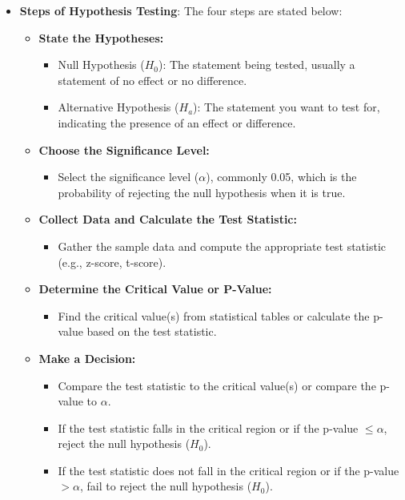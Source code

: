 \documentclass{article}
\begin{document}
\begin{itemize}
\item \textbf{Steps of Hypothesis Testing}: The four steps are stated below:

\begin{itemize}
    \item \textbf{State the Hypotheses:}
    \begin{itemize}
        \item Null Hypothesis ($H_0$): The statement being tested, usually a statement of no effect or no difference.
        \item Alternative Hypothesis ($H_a$): The statement you want to test for, indicating the presence of an effect or difference.
    \end{itemize}

    \item \textbf{Choose the Significance Level:}
    \begin{itemize}
        \item Select the significance level ($\alpha$), commonly 0.05, which is the probability of rejecting the null hypothesis when it is true.
    \end{itemize}

    \item \textbf{Collect Data and Calculate the Test Statistic:}
    \begin{itemize}
        \item Gather the sample data and compute the appropriate test statistic (e.g., z-score, t-score).
    \end{itemize}

    \item \textbf{Determine the Critical Value or P-Value:}
    \begin{itemize}
        \item Find the critical value(s) from statistical tables or calculate the p-value based on the test statistic.
    \end{itemize}

    \item \textbf{Make a Decision:}
    \begin{itemize}
        \item Compare the test statistic to the critical value(s) or compare the p-value to $\alpha$.
        \item If the test statistic falls in the critical region or if the p-value $\leq \alpha$, reject the null hypothesis ($H_0$).
        \item If the test statistic does not fall in the critical region or if the p-value $> \alpha$, fail to reject the null hypothesis ($H_0$).
    \end{itemize}


\end{itemize}
\end{itemize}
\end{document}

